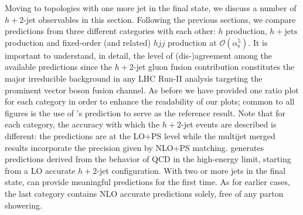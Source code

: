 Moving to topologies with one more jet in the final state, 
we discuss a number of $h+2$-jet
observables in this section. Following the previous sections, we compare predictions from three
different categories with each other: \NNLOPS $h$ production,
\MEPSatNLO $h+\text{jets}$ production and fixed-order (and related)
$hjj$ production at $\mathcal{O}(\alpha_\mathrm{s}^5)$. It is important
to understand, in detail, the level of (dis-)agreement among the
available predictions since the $h+2$-jet gluon fusion contribution
constitutes the major irreducible background in any LHC Run-II analysis
targeting the prominent vector boson fusion channel. As before we have
provided one ratio plot for each category in order to enhance the
readability of our plots; common to all figures is the use of \Powheg's
\NNLOPS prediction to serve as the reference result. Note that for
each category, the accuracy with which the $h+2$-jet events are
described is different: the \NNLOPS predictions are at the LO+PS level
while the multijet merged results incorporate the precision given by NLO+PS
matching. \Hej generates predictions derived from the behavior of QCD
in the high-energy limit, starting from a LO accurate $h+2$-jet configuration.
With two or more jets in the final state,
\Hej can provide meaningful predictions for the first time. As
for earlier cases, the last category contains NLO accurate predictions
solely, free of any parton showering.

